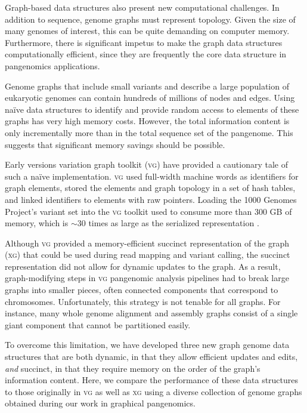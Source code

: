 \documentclass{article}
\begin{document}
Graph-based data structures also present new computational challenges.
In addition to sequence, genome graphs must represent topology.
Given the size of many genomes of interest, this can be quite demanding on computer memory.
Furthermore, there is significant impetus to make the graph data structures computationally efficient, since they are frequently the core data structure in pangenomics applications.

Genome graphs that include small variants and describe a large population of eukaryotic genomes can contain hundreds of millions of nodes and edges.
Using na\"ive data structures to identify and provide random access to elements of these graphs has very high memory costs.
However, the total information content is only incrementally more than in the total sequence set of the pangenome.
This suggests that significant memory savings should be possible.

Early versions variation graph toolkit (\textsc{vg}) \cite{Garrison_2018} have provided a cautionary tale of such a na\"ive implementation.
\textsc{vg} used full-width machine words as identifiers for graph elements, stored the elements and graph topology in a set of hash tables, and linked identifiers to elements with raw pointers.
Loading the 1000 Genomes Project's variant set into the \textsc{vg} toolkit used to consume more than 300 GB of memory, which is $\sim$30 times as large as the serialized representation \cite{Garrison_2019}.

Although \textsc{vg} provided a memory-efficient succinct representation of the graph (\textsc{xg}) that could be used during read mapping and variant calling, the succinct representation did not allow for dynamic updates to the graph.
As a result, graph-modifying steps in \textsc{vg} pangenomic analysis pipelines had to break large graphs into smaller pieces, often connected components that correspond to chromosomes.
Unfortunately, this strategy is not tenable for all graphs.
For instance, many whole genome alignment and assembly graphs consist of a single giant component that cannot be partitioned easily.

To overcome this limitation, we have developed three new graph genome data structures that are both dynamic, in that they allow efficient updates and edits, \emph{and} succinct, in that they require memory on the order of the graph's information content.
Here, we compare the performance of these data structures to those originally in \textsc{vg} as well as \textsc{xg} using a diverse collection of genome graphs obtained during our work in graphical pangenomics.
\end{document}
